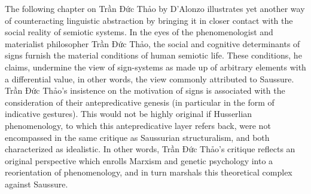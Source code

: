 \documentclass[output=paper]{langsci/langscibook}
\begin{document}
The following chapter on Trần Đức Thảo by D'Alonzo illustrates yet another way of counteracting linguistic abstraction by bringing it in closer contact with the social reality of semiotic systems. In the eyes of the phenomenologist and materialist philosopher Trần Đức Thảo, the social and cognitive determinants of signs furnish the material conditions of human semiotic life. These conditions, he claims, undermine the view of sign-systems as made up of arbitrary elements with a differential value, in other words, the view commonly attributed to Saussure. Trần Đức Thảo's insistence on the motivation of signs is associated with the consideration of their antepredicative genesis (in particular in the form of indicative gestures). This would not be highly original if Husserlian phenomenology, to which this antepredicative layer refers back, were not encompassed in the same critique as Saussurian structuralism, and both characterized as idealistic. In other words, Trần Đức Thảo's critique reflects an original perspective which enrolls Marxism and genetic psychology into a reorientation of phenomenology, and in turn marshals this theoretical complex against Saussure.

\end{document}
